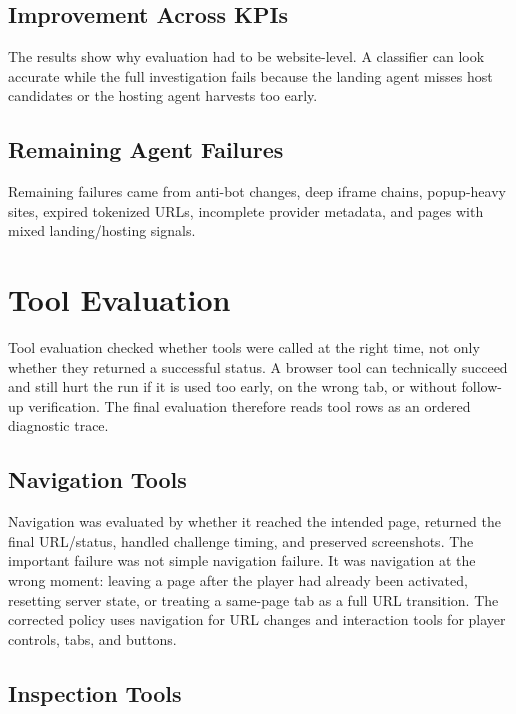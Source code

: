 

\subsection{Improvement Across KPIs}

The results show why evaluation had to be website-level. A classifier can look
accurate while the full investigation fails because the landing agent misses
host candidates or the hosting agent harvests too early.

\subsection{Remaining Agent Failures}

Remaining failures came from anti-bot changes, deep iframe chains, popup-heavy
sites, expired tokenized URLs, incomplete provider metadata, and pages with
mixed landing/hosting signals.

\section{Tool Evaluation}

Tool evaluation checked whether tools were called at the right time, not only
whether they returned a successful status. A browser tool can technically
succeed and still hurt the run if it is used too early, on the wrong tab, or
without follow-up verification. The final evaluation therefore reads tool rows
as an ordered diagnostic trace.



\subsection{Navigation Tools}

Navigation was evaluated by whether it reached the intended page, returned the
final URL/status, handled challenge timing, and preserved screenshots. The
important failure was not simple navigation failure. It was navigation at the
wrong moment: leaving a page after the player had already been activated,
resetting server state, or treating a same-page tab as a full URL transition.
The corrected policy uses navigation for URL changes and interaction tools for
player controls, tabs, and buttons.

\subsection{Inspection Tools}

